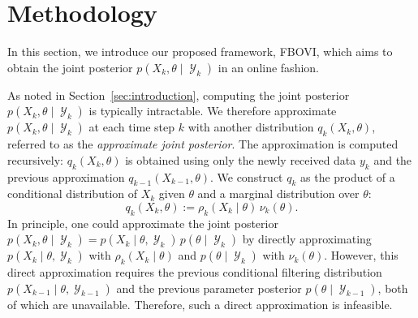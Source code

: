 \documentclass[preprint,3p,times]{elsarticle}
\DeclareMathOperator{\Y}{\mathcal{Y}}
\newcommand{\pdense}{p}
\begin{document}
\section{Methodology}
\label{sec:methodology}
In this section, we introduce our proposed framework, FBOVI, which aims to obtain the joint posterior $p(X_k,\theta \mid \Y_k)$ in an online fashion.

As noted in Section~\ref{sec:introduction}, computing the joint posterior $\pdense(X_k,\theta \mid \Y_k)$ is typically intractable. We therefore approximate $\pdense(X_k,\theta \mid \Y_k)$ at each time step $k$ with another distribution $q_k(X_k,\theta)$, referred to as the \emph{approximate joint posterior}. The approximation is computed recursively: $q_k(X_k,\theta)$ is obtained using only the newly received data $y_k$ and the previous approximation $q_{k-1}(X_{k-1},\theta)$. We construct $q_k$ as the product of a conditional distribution of $X_k$ given $\theta$ and a marginal distribution over $\theta$:
\begin{equation*}
q_k(X_k,\theta) := \rho_k(X_k \mid \theta)\,\nu_k(\theta).
\end{equation*}
In principle, one could approximate the joint posterior $\pdense(X_k,\theta \mid \Y_k)=\pdense(X_k \mid \theta,\Y_k)\,\pdense(\theta \mid \Y_k)$ by directly approximating $\pdense(X_k \mid \theta,\Y_k)$ with $\rho_k(X_k \mid \theta)$ and $\pdense(\theta \mid \Y_k)$ with $\nu_k(\theta)$. However, this direct approximation requires the previous conditional filtering distribution $\pdense(X_{k-1}\mid \theta,\Y_{k-1})$ and the previous parameter posterior $\pdense(\theta \mid \Y_{k-1})$, both of which are unavailable. Therefore, such a direct approximation is infeasible.
\end{document}
